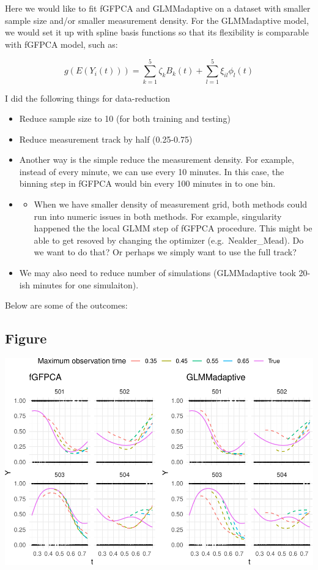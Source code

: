 \documentclass[
]{article}
\providecommand{\tightlist}{%
  \setlength{\itemsep}{0pt}\setlength{\parskip}{0pt}}
\begin{document}
Here we would like to fit fGFPCA and GLMMadaptive on a dataset with
smaller sample size and/or smaller measurement density. For the
GLMMadaptive model, we would set it up with spline basis functions so
that its flexibility is comparable with fGFPCA model, such as:

\[g(E(Y_i(t))) = \sum_{k=1}^5\zeta_{k}B_k(t)+\sum_{l=1}^5\xi_{il}\phi_l(t)\]

I did the following things for data-reduction

\begin{itemize}
\item
  Reduce sample size to 10 (for both training and testing)
\item
  Reduce measurement track by half (0.25-0.75)
\item
  Another way is the simple reduce the measurement density. For example,
  instead of every minute, we can use every 10 minutes. In this case,
  the binning step in fGFPCA would bin every 100 minutes in to one bin.
\item
  \begin{itemize}
  \tightlist
  \item
    When we have smaller density of measurement grid, both methods could
    run into numeric issues in both methods. For example, singularity
    happened the the local GLMM step of fGFPCA procedure. This might be
    able to get resoved by changing the optimizer (e.g.~Nealder\_Mead).
    Do we want to do that? Or perhaps we simply want to use the full
    track?
  \end{itemize}
\item
  We may also need to reduce number of simulations (GLMMadaptive took
  20-ish minutes for one simulaiton).
\end{itemize}

Below are some of the outcomes:

\hypertarget{figure-1}{%
\subsection{Figure}\label{figure-1}}

\includegraphics{manuscript_files/figure-latex/unnamed-chunk-7-1.pdf}
\end{document}
